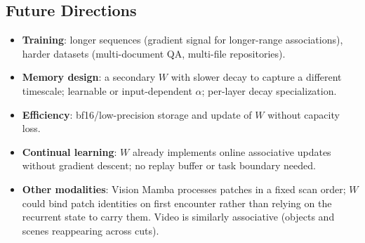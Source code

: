 \documentclass{article}
\begin{document}
\subsection*{Future Directions}
\begin{itemize}
  \item \textbf{Training}: longer sequences (gradient signal for longer-range associations), harder datasets (multi-document QA, multi-file repositories).
  \item \textbf{Memory design}: a secondary $W$ with slower decay to capture a different timescale; learnable or input-dependent $\alpha$; per-layer decay specialization.
  \item \textbf{Efficiency}: bf16/low-precision storage and update of $W$ without capacity loss.
  \item \textbf{Continual learning}: $W$ already implements online associative updates without gradient descent; no replay buffer or task boundary needed.
  \item \textbf{Other modalities}: Vision Mamba processes patches in a fixed scan order; $W$ could bind patch identities on first encounter rather than relying on the recurrent state to carry them. Video is similarly associative (objects and scenes reappearing across cuts).
\end{itemize}
\end{document}
